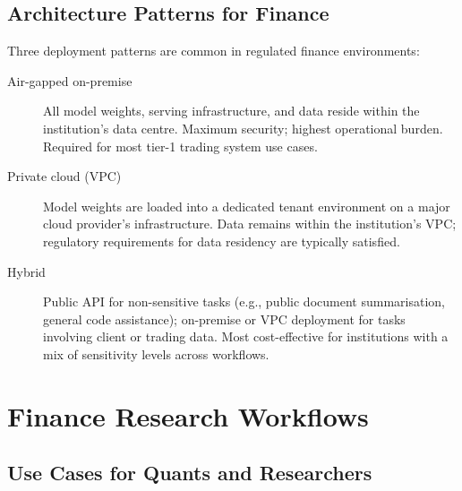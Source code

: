 \subsection{Architecture Patterns for Finance}
\label{app:hf:arch}

Three deployment patterns are common in regulated finance environments:

\begin{description}
  \item[Air-gapped on-premise] All model weights, serving infrastructure, and
        data reside within the institution's data centre.  Maximum security;
        highest operational burden.  Required for most tier-1 trading system
        use cases.

  \item[Private cloud (VPC)] Model weights are loaded into a dedicated tenant
        environment on a major cloud provider's infrastructure.  Data remains
        within the institution's VPC; regulatory requirements for data residency
        are typically satisfied.

  \item[Hybrid] Public API for non-sensitive tasks (e.g., public document
        summarisation, general code assistance); on-premise or VPC deployment
        for tasks involving client or trading data.  Most cost-effective for
        institutions with a mix of sensitivity levels across workflows.
\end{description}

\section{Finance Research Workflows}
\label{app:hf:finance}

\subsection{Use Cases for Quants and Researchers}
\label{app:hf:use-cases}


